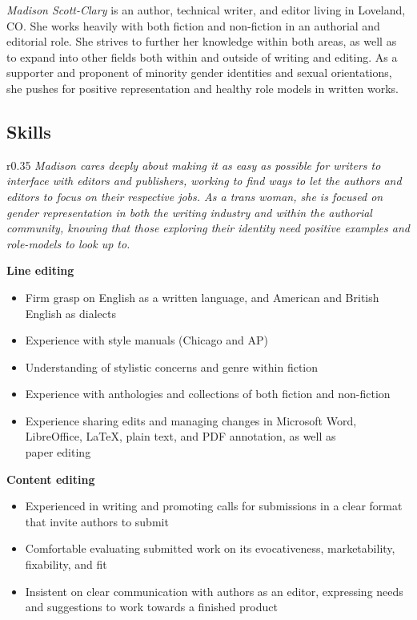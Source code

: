 \documentclass[letterpaper]{memoir}
\begin{document}


\textit{\large Madison Scott-Clary} is an author, technical writer, and editor living in Loveland, CO. She works heavily with both fiction and non-fiction in an authorial and editorial role. She strives to further her knowledge within both areas, as well as to expand into other fields both within and outside of writing and editing. As a supporter and proponent of minority gender identities and sexual orientations, she pushes for positive representation and healthy role models in written works.

\subsection{Skills}

\begin{wrapfigure}{r}{0.35\linewidth}
  \textit{\color{titlegreydark} \large Madison cares deeply about making it as easy as possible for writers to interface with editors and publishers, working to find ways to let the authors and editors to focus on their respective jobs. As a trans woman, she is focused on gender representation in both the writing industry and within the authorial community, knowing that those exploring their identity need positive examples and role-models to look up to.}
  \vspace{-1in}
\end{wrapfigure}

\textbf{Line editing}

\begin{itemize}
  \item Firm grasp on English as a written language, and American and British English as dialects
  \item Experience with style manuals (Chicago and AP)
  \item Understanding of stylistic concerns and genre within fiction
  \item Experience with anthologies and collections of both fiction and non-fiction
  \item Experience sharing edits and managing changes in Microsoft Word, LibreOffice, \LaTeX, plain text, and PDF annotation, as well as\\ paper editing
\end{itemize}

\hspace{-1.5em}\textbf{Content editing}

\begin{itemize}
  \item Experienced in writing and promoting calls for submissions in a clear format that invite authors to submit
  \item Comfortable evaluating submitted work on its evocativeness, marketability, fixability, and fit
  \item Insistent on clear communication with authors as an editor, expressing needs and suggestions to work towards a finished product
\end{itemize}
\end{document}
